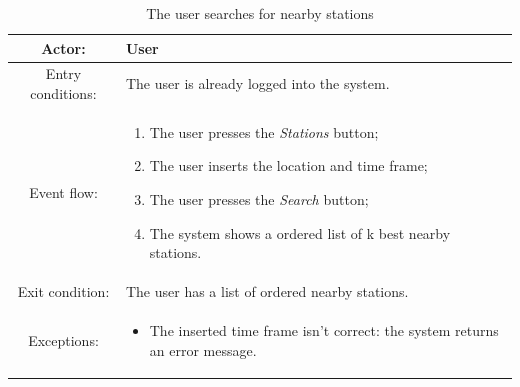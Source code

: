 \begin{table}[h]
    \begin{center}
        \begin{tabular}{|c||p{10cm}|}
            \hline
            Actor:            & User                                            \\
            \hline
            Entry conditions: & The user is already logged into the system.     \\
            \hline
            Event flow:       &
            \begin{enumerate}
                \item The user presses the \textit{Stations} button;
                \item The user inserts the location and time frame;
                \item The user presses the \textit{Search} button;
                \item The system shows a ordered list of k best nearby stations.
            \end{enumerate}
            \\
            \hline
            Exit condition:   & The user has a list of ordered nearby stations. \\
            \hline
            Exceptions:       &
            \begin{itemize}
                \item The inserted time frame isn't correct: the system returns an error message.
            \end{itemize}
            \\
            \hline
        \end{tabular}
    \end{center}
    \caption{The user searches for nearby stations}
\end{table}

